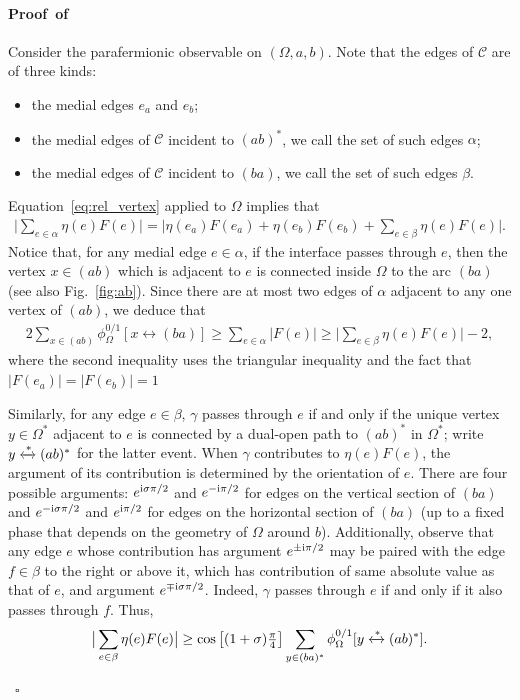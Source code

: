\documentclass[a4paper,oneside,11pt]{article}
\numberwithin{equation}{section}
\numberwithin{equation}{section}
\numberwithin{equation}{section}
\newenvironment{proof}[1][\relax]%
  {\paragraph{Proof\ifx#1\relax\else~of #1\fi}}%
  {~\hfill$\square$\par\bigskip}
\newcommand{\calC}{\mathcal{C}}
\begin{document}
\begin{proof}
Consider the parafermionic observable on $(\Omega,a,b)$. Note that the edges of $\calC$ are of three kinds:
    \begin{itemize}[noitemsep]
    \item the medial edges $e_a$ and $e_b$;
    \item the medial edges of $\calC$ incident to $(ab)^*$, we call the set of such edges $\alpha$; 
    \item the medial edges of $\calC$ incident to $(ba)$, we call the set of such edges $\beta$.
    \end{itemize} 
   Equation~\eqref{eq:rel_vertex} applied to $\Omega$ implies that 
    \begin{align*}	    \big|\sum_{e\in \alpha}\eta(e)F(e)\big| 
	    = \big|\eta(e_a)F(e_a)+\eta(e_b)F(e_b)+\sum_{e\in \beta}\eta(e)F(e)\big|.
    \end{align*}
    Notice that, for any medial edge $e \in \alpha$, if the interface passes through $e$, then the vertex $x \in (ab)$ which is adjacent to $e$ 
	is connected inside $\Omega$ to the arc $(ba)$ (see also Fig.~\ref{fig:ab}). 
	Since there are at most two edges of $\alpha$ adjacent to any one vertex of $(ab)$, 
	we deduce that 
    \begin{align}\label{eq:h11}
    	2 \sum_{x\in(ab)}\phi_\Omega^{0/1}[x\longleftrightarrow (ba)]\ge  \sum_{e\in \alpha}|F(e)|\ge \big|\sum_{e\in\beta}\eta(e)F(e)\big|-2,
	\end{align}
	where the second inequality uses the triangular inequality and the fact that $|F(e_a)|=|F(e_b)|=1$

	Similarly, for any edge $e \in \beta$, 
    $\gamma$ passes through $e$ if and only if 
    the unique vertex $y \in \Omega^*$ adjacent to $e$ is connected by a dual-open path to $(ab)^*$ in $\Omega^*$;
    write $y\xleftrightarrow{*} (ab)^*$ for the latter event. 
	When $\gamma$ contributes to $\eta(e) F(e)$, the argument of its contribution is determined by the orientation of $e$.
    There are four possible arguments: $e^{{\rm i}\sigma \pi/2}$ and $e^{-{\rm i} \pi/2}$ for edges on the vertical section of $(ba)$ 
    and $e^{-{\rm i}\sigma \pi/2}$ and $e^{{\rm i} \pi/2}$ for edges on the horizontal section of $(ba)$ 
    (up to a fixed phase that depends on the geometry of $\Omega$ around $b$). 
    Additionally, observe that any edge $e$ whose contribution has argument $e^{\pm{\rm i} \pi/2}$ 
    may be paired with the edge $f \in \beta$ to the right or above it, 
    which has contribution of same absolute value as that of $e$, and argument $e^{\mp{\rm i}\sigma \pi/2}$.	
    Indeed, $\gamma$ passes through $e$ if and only if it also passes through $f$. 
    Thus,
    \begin{equation}\label{eq:h12}
    	\big|\sum_{e\in\beta}\eta(e)F(e)\big| \geq  \cos \big[(1+\sigma)\tfrac{\pi}{4}\big]\sum_{y\in(ba)^*}\phi_\Omega^{0/1}[y\xleftrightarrow{*}(ab)^*].
    \end{equation}
      

\end{proof}
\end{document}
